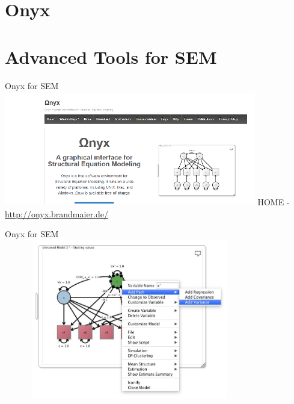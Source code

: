 \documentclass{beamer}
\begin{document}
\section{Onyx}

\section{Advanced Tools for SEM}

\begin{frame}{Onyx for SEM}
\centering 
\includegraphics[height=5cm, width=11cm]{onyx_1}
HOME - \url{http://onyx.brandmaier.de/}
\end{frame} 

\begin{frame}{Onyx for SEM}
\centering 
\includegraphics[height=7cm, width=11cm]{onyx.jpg}

\end{frame} 
\end{document}
